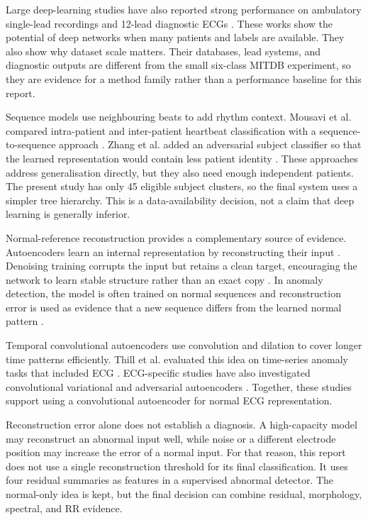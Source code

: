 Large deep-learning studies have also reported strong performance on ambulatory
single-lead recordings and 12-lead diagnostic ECGs
\cite{hannun2019cardiologist,ribeiro2020ecg}. These works show the potential of
deep networks when many patients and labels are available. They also show why
dataset scale matters. Their databases, lead systems, and diagnostic outputs are
different from the small six-class MITDB experiment, so they are evidence for a
method family rather than a performance baseline for this report.

Sequence models use neighbouring beats to add rhythm context. Mousavi et al.
compared intra-patient and inter-patient heartbeat classification with a
sequence-to-sequence approach \cite{mousavi2019seq2seq}. Zhang et al. added an
adversarial subject classifier so that the learned representation would contain
less patient identity \cite{zhang2021interpatient}. These approaches address
generalisation directly, but they also need enough independent patients. The
present study has only 45 eligible subject clusters, so the final system uses a
simpler tree hierarchy. This is a data-availability decision, not a claim that
deep learning is generally inferior.

Normal-reference reconstruction provides a complementary source of evidence.
Autoencoders learn an internal representation by reconstructing their input
\cite{hinton2006autoencoder}. Denoising training corrupts the input but retains a
clean target, encouraging the network to learn stable structure rather than an
exact copy \cite{vincent2008denoising}. In anomaly detection, the model is often
trained on normal sequences and reconstruction error is used as evidence that a
new sequence differs from the learned normal pattern
\cite{chandola2009anomaly,malhotra2016lstm}.

Temporal convolutional autoencoders use convolution and dilation to cover longer
time patterns efficiently. Thill et al. evaluated this idea on time-series
anomaly tasks that included ECG \cite{thill2021tcnae}. ECG-specific studies have
also investigated convolutional variational and adversarial autoencoders
\cite{jang2021cvae,zhou2022aae}. Together, these studies support using a
convolutional autoencoder for normal ECG representation.

Reconstruction error alone does not establish a diagnosis. A
high-capacity model may reconstruct an abnormal input well, while noise or a
different electrode position may increase the error of a normal input. For that
reason, this report does not use a single reconstruction threshold for its final
classification. It uses four residual summaries as features in a supervised abnormal
detector. The normal-only idea is kept, but the final decision can combine
residual, morphology, spectral, and RR evidence.

